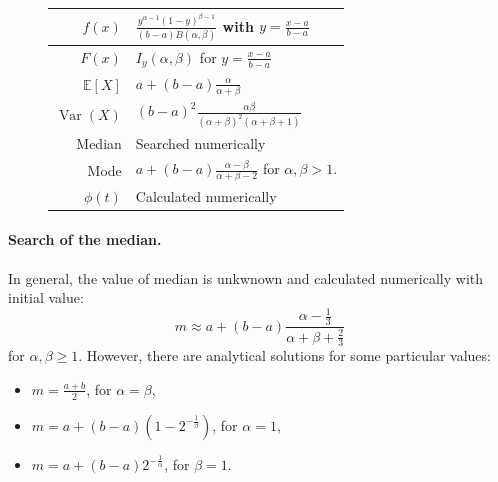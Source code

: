 \documentclass[a4paper,11pt]{article}
\theoremstyle{plain}
\theoremstyle{definition}
\newcommand{\ME}{\mathbb{E}}
\newcommand{\Var}{\operatorname{Var}}
\begin{document}
\begin{figure}[!htb]
\begin{minipage}{0.4\textwidth}
\begin{tabular}{| r | l |}
			\hline
			$f(x)$ & $\frac{y^{\alpha - 1}(1 - y)^{\beta - 1}}{(b-a)B(\alpha, \beta)}$ with $y = \frac{x - a}{b - a}$ \\
			\hline
			$F(x)$ & $I_{y}(\alpha, \beta)$ for $y = \frac{x - a}{b - a}$\\
			\hline
			$\ME[X]$ & $a + (b-a)\frac{\alpha}{\alpha + \beta}$ \\
			\hline
			$\Var(X)$ & $(b-a)^2\frac{ \alpha \beta}{(\alpha + \beta)^2 (\alpha + \beta + 1)}$ \\
			\hline
			Median & Searched numerically \\
			\hline
			Mode & $a + (b-a)\frac{\alpha - \beta}{\alpha + \beta - 2}$ for $\alpha, \beta > 1$. \\
			\hline
			$\phi(t)$ & Calculated numerically \\
			\hline
		\end{tabular}
	\end{minipage}
	\end{figure}
	
	\paragraph{Search of the median.}
	In general, the value of median is unkwnown and calculated numerically with initial value:
	\[
	m \approx a + (b-a)\frac{\alpha - \frac{1}{3} }{ \alpha + \beta + \frac{2}{3} }
	\]
	for $\alpha, \beta \geq 1$.	However, there are analytical solutions for some particular values:
	\begin{itemize}
		\item $m = \frac{a + b}{2}$, for $\alpha = \beta$,
		\item $m = a + (b-a)(1 - 2^{-\frac{1}{\beta}})$, for $\alpha = 1$,
		\item $m = a+(b-a)2^{-\frac{1}{\alpha}}$, for $\beta = 1$.
	\end{itemize}
	
\end{document}
